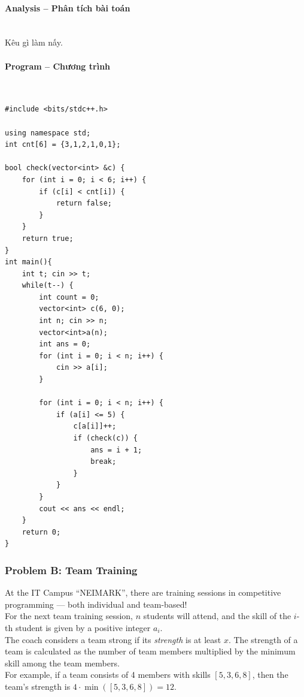 \documentclass{article}
\begin{document}
\paragraph{Analysis -- Phân tích bài toán} \mbox{} \\

Kêu gì làm nấy.

\paragraph{Program -- Chương trình} \mbox{} \\

\begin{lstlisting}
#include <bits/stdc++.h>

using namespace std;
int cnt[6] = {3,1,2,1,0,1};

bool check(vector<int> &c) {
	for (int i = 0; i < 6; i++) {
		if (c[i] < cnt[i]) {
			return false;
		}
	}
	return true;
}
int main(){
	int t; cin >> t;
	while(t--) {
		int count = 0;
		vector<int> c(6, 0);
		int n; cin >> n;
		vector<int>a(n);
		int ans = 0;
		for (int i = 0; i < n; i++) {
			cin >> a[i];            
		}
		
		for (int i = 0; i < n; i++) {
			if (a[i] <= 5) {
				c[a[i]]++;
				if (check(c)) {
					ans = i + 1;
					break;
				}
			}               
		}
		cout << ans << endl;
	}
	return 0;
}
\end{lstlisting}

\subsubsection{Problem B: Team Training}

At the IT Campus ``NEIMARK'', there are training sessions in competitive programming — both individual and team-based!\\

For the next team training session, $n$ students will attend, and the skill of the $i$-th student is given by a positive integer $a_i$.\\

The coach considers a team strong if its \textit{strength} is at least $x$. The strength of a team is calculated as the number of team members multiplied by the minimum skill among the team members.\\

For example, if a team consists of 4 members with skills $[5, 3, 6, 8]$, then the team's strength is $4 \cdot \min([5, 3, 6, 8]) = 12$.\\
\end{document}
